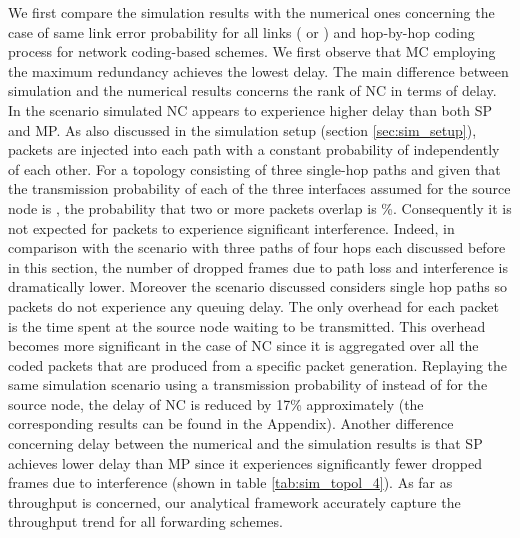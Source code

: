 \documentclass[journal, onecolumn, 12pt]{IEEEtran}
\begin{document}
We first compare the simulation results with the numerical ones concerning the case of same link error probability for all links ( or ) and hop-by-hop coding process
for network coding-based schemes.
We first observe that MC employing the maximum redundancy achieves the lowest delay.
The main difference between simulation and the numerical results concerns the rank of NC in terms of delay.
In the scenario simulated NC appears to experience higher delay than both SP and MP.
As also discussed in the simulation setup (section \ref{sec:sim_setup}), packets are injected into each path with a constant probability of  independently of each other.
For a topology consisting of three single-hop paths and given that the transmission probability of each of the three interfaces assumed for the source node is , the probability that two or more packets overlap is \%.
Consequently it is not expected for packets to experience significant interference.
Indeed, in comparison with the scenario with three paths of four hops each discussed before in this section, the number of dropped frames due to path loss and interference is dramatically lower.
Moreover the scenario discussed considers single hop paths so packets do not experience any queuing delay.
The only overhead for each packet is the time spent at the source node waiting to be transmitted.
This overhead becomes more significant in the case of NC since it is aggregated over all the coded packets that are produced from a specific packet generation.
Replaying the same simulation scenario using a transmission probability of  instead of  for the source node, the delay of NC is reduced by 17\% approximately (the corresponding results can be found in the Appendix).
Another difference concerning delay between the numerical and the simulation results is that SP achieves lower delay than MP since it experiences significantly fewer dropped frames due to interference (shown in table \ref{tab:sim_topol_4}).
As far as throughput is concerned, our analytical framework accurately capture the throughput trend for all forwarding schemes.
\end{document}
